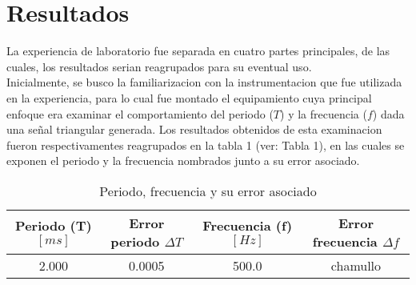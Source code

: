 \section{Resultados}
La experiencia de laboratorio fue separada en cuatro partes principales, de las cuales, los resultados serian
reagrupados para su eventual uso.\\

Inicialmente, se busco la familiarizacion con la instrumentacion que fue utilizada en la experiencia, para lo cual
fue montado el equipamiento cuya principal enfoque era examinar el comportamiento del periodo ($T$) y la
frecuencia ($f$) dada una señal triangular generada. Los resultados obtenidos de esta examinacion fueron
respectivamentes reagrupados en la tabla 1 (ver: Tabla 1), en las cuales se exponen el periodo y la frecuencia
nombrados junto a su error asociado.\\
{ %
\begin{table}
    \begin{tabular}{|c|c|c|c|}
     \hline
         Periodo (T) $[ms]$ & Error periodo $\Delta T$ & Frecuencia (f) $[Hz]$ & Error frecuencia $\Delta f$\\ \hline
         2.000 & 0.0005 & 500.0 & chamullo \\ \hline
     \end{tabular}\\
     \caption{Periodo, frecuencia y su error asociado}
\end{table}
}

